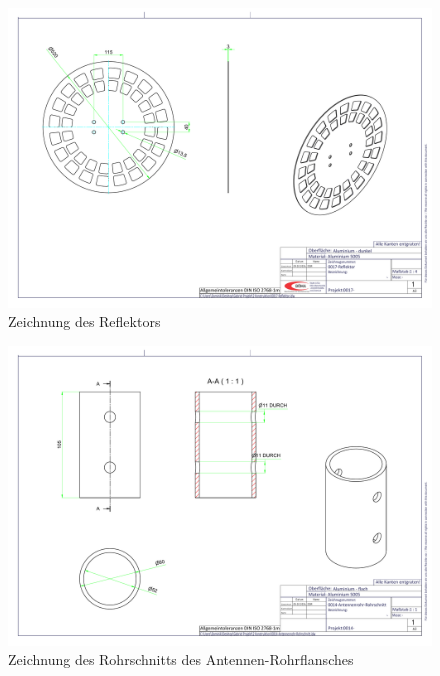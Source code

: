 \begin{landscape}
	\begin{figure}[h!]
	\includegraphics[angle=90,width=\textwidth]{../ref/0017-Reflektor.pdf}
	\caption{Zeichnung des Reflektors}
	\label{fig:Reflektor-Zeichnung}
\end{figure}
\end{landscape}

\begin{landscape}
	\begin{figure}[h!]
	\includegraphics[angle=90,width=\textwidth]{../ref/0014-Antennenrohr-Rohrschnitt.pdf}
	\caption{Zeichnung des Rohrschnitts des Antennen-Rohrflansches}
	\label{fig:Rohrschnitt-Rohrflansch-Antenne}
\end{figure}
\end{landscape}

